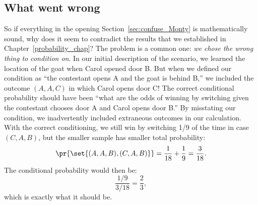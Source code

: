 \subsection{What went wrong}

So if everything in the opening Section~\ref{sec:confuse_Monty} is
mathematically sound, why does it seem to contradict the results that
we established in Chapter~\ref{probability_chap}?  The problem is a
common one: \emph{we chose the wrong thing to condition on}.  In our
initial description of the scenario, we learned the location of the
goat when Carol opened door B.  But when we defined our condition as
``the contestant opens A and the goat is behind B,'' we included the
outcome $(A, A, C)$ in which Carol opens door C!  The correct
conditional probability should have been ``what are the odds of
winning by switching given the contestant chooses door A and Carol
opens door B.''  By misstating our condition, we inadvertently
included extraneous outcomes in our calculation.  With the correct
conditioning, we still win by switching 1/9 of the time in case $(C,
A, B)$, but the smaller sample has smaller total probability:
\[
\pr{\set{(A, A, B),(C, A, B)}} = \frac{1}{18} + \frac{1}{9} = \frac{3}{18}.
\]
The conditional probability would then be:
\[
\frac{1/9}{3/18} = \frac{2}{3},
\]
which is exactly what it should be.

